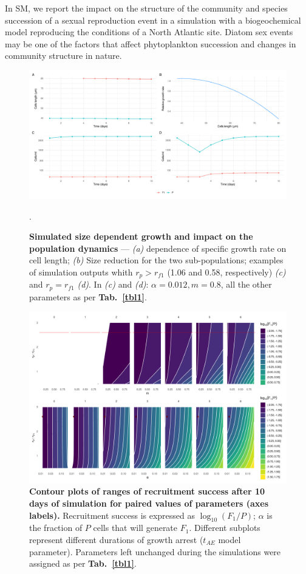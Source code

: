 \documentclass[a4paper,oneside]{article}
\begin{document}
    In SM, we report the impact on the structure of the community and species succession of a sexual reproduction event in a simulation with a biogeochemical model reproducing the conditions of a North Atlantic site.
    Diatom sex events may be one of the factors that affect phytoplankton succession and changes in community structure in nature.
    \begin{figure}[p]
      \includegraphics[width=\linewidth]{imgs/Figpan.pdf}
      \caption{\textbf{Simulated size dependent growth and impact on the population dynamics} ---
        {\color{blue}\textit{(a)}} dependence of specific growth rate on cell length;
        {\color{blue}\textit{(b)}} Size reduction for the two sub-populations;
        examples of simulation outputs whith $r_{p} >r_{f1}$ (1.06 and 0.58, respectively) {\color{blue}\textit{(c)}} and $r_{p} = r_{f1}$ {\color{blue}\textit{(d)}}.
        In {\color{blue}\textit{(c)}} and {\color{blue}\textit{(d)}}: $\alpha=0.012, m = 0.8$, all the other parameters as per \textbf{Tab.~\ref{tbl1}}.
      }\label{fdyn}.
    \end{figure}
    \begin{figure}[p]
        \includegraphics[width=\linewidth]{imgs/parswpan.pdf}
      \caption{\textbf{Contour plots of ranges of recruitment success after 10 days of simulation for paired values of parameters (axes labels).}
        Recruitment success is expressed as $\log_{10}(F_{1}/P)$; $\alpha$ is the fraction of $P$ cells that will generate $F_{1}$.
        Different subplots represent different durations of growth arrest ($t_{AE}$ model parameter).
        Parameters left unchanged during the simulations were assigned as per \textbf{Tab.~\ref{tbl1}}.
      }\label{swep}
    \end{figure}
\end{document}
